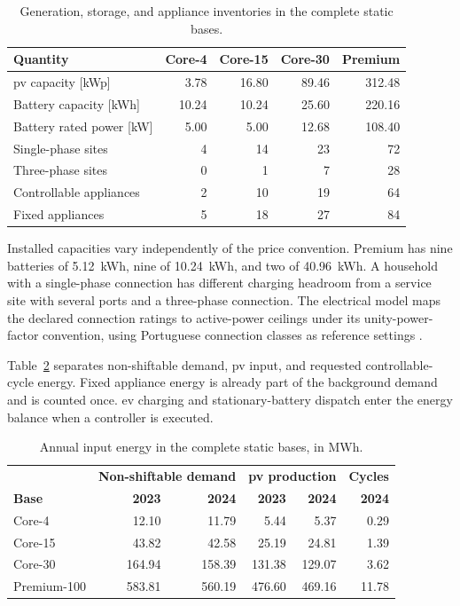 \begin{table}[htbp]
\centering\small
\caption{Generation, storage, and appliance inventories in the complete static bases.}
\label{tab:app-portugal-assets}
\begin{tabularx}{\textwidth}{@{}Xrrrr@{}}
\toprule
\textbf{Quantity} & \textbf{Core-4} & \textbf{Core-15} & \textbf{Core-30} & \textbf{Premium}\\
\midrule
\gls{pv} capacity [kWp] & 3.78 & 16.80 & 89.46 & 312.48\\
Battery capacity [kWh] & 10.24 & 10.24 & 25.60 & 220.16\\
Battery rated power [kW] & 5.00 & 5.00 & 12.68 & 108.40\\
Single-phase sites & 4 & 14 & 23 & 72\\
Three-phase sites & 0 & 1 & 7 & 28\\
Controllable appliances & 2 & 10 & 19 & 64\\
Fixed appliances & 5 & 18 & 27 & 84\\
\bottomrule
\end{tabularx}
\end{table}

Installed capacities vary independently of the price convention. Premium has nine batteries of 5.12~kWh, nine of 10.24~kWh, and two of 40.96~kWh. A household with a single-phase connection has different charging headroom from a service site with several ports and a three-phase connection. The electrical model maps the declared connection ratings to active-power ceilings under its unity-power-factor convention, using Portuguese connection classes as reference settings \parencite{ersecontractedpower,eredesconnectionmanual}.

Table~\ref{tab:app-portugal-energy} separates non-shiftable demand, \gls{pv} input, and requested controllable-cycle energy. Fixed appliance energy is already part of the background demand and is counted once. \gls{ev} charging and stationary-battery dispatch enter the energy balance when a controller is executed.

\begin{table}[htbp]
\centering\small
\caption{Annual input energy in the complete static bases, in MWh.}
\label{tab:app-portugal-energy}
\begin{tabularx}{\textwidth}{@{}Xrrrrr@{}}
\toprule
 & \multicolumn{2}{c}{\textbf{Non-shiftable demand}} & \multicolumn{2}{c}{\textbf{\gls{pv} production}} & \textbf{Cycles}\\
\textbf{Base} & \textbf{2023} & \textbf{2024} & \textbf{2023} & \textbf{2024} & \textbf{2024}\\
\midrule
Core-4 & 12.10 & 11.79 & 5.44 & 5.37 & 0.29\\
Core-15 & 43.82 & 42.58 & 25.19 & 24.81 & 1.39\\
Core-30 & 164.94 & 158.39 & 131.38 & 129.07 & 3.62\\
Premium-100 & 583.81 & 560.19 & 476.60 & 469.16 & 11.78\\
\bottomrule
\end{tabularx}
\end{table}

